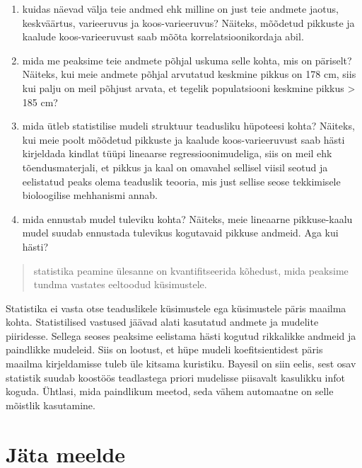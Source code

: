 \documentclass[]{book}
\begin{document}
\begin{enumerate}
\def\labelenumi{\arabic{enumi})}
\item
  kuidas näevad välja teie andmed ehk milline on just teie andmete jaotus, keskväärtus, varieeruvus ja koos-varieeruvus? Näiteks, mõõdetud pikkuste ja kaalude koos-varieeruvust saab mõõta korrelatsioonikordaja abil.
\item
  mida me peaksime teie andmete põhjal uskuma selle kohta, mis on päriselt? Näiteks, kui meie andmete põhjal arvutatud keskmine pikkus on 178 cm, siis kui palju on meil põhjust arvata, et tegelik populatsiooni keskmine pikkus \textgreater{} 185 cm?
\item
  mida ütleb statistilise mudeli struktuur teadusliku hüpoteesi kohta? Näiteks, kui meie poolt mõõdetud pikkuste ja kaalude koos-varieeruvust saab hästi kirjeldada kindlat tüüpi lineaarse regressioonimudeliga, siis on meil ehk tõendusmaterjali, et pikkus ja kaal on omavahel sellisel viisil seotud ja eelistatud peaks olema teaduslik teooria, mis just sellise seose tekkimisele bioloogilise mehhanismi annab.
\item
  mida ennustab mudel tuleviku kohta? Näiteks, meie lineaarne pikkuse-kaalu mudel suudab ennustada tulevikus kogutavaid pikkuse andmeid. Aga kui hästi?
\end{enumerate}

\begin{quote}
statistika peamine ülesanne on kvantifitseerida kõhedust, mida peaksime tundma vastates eeltoodud küsimustele.
\end{quote}

Statistika ei vasta otse teaduslikele küsimustele ega küsimustele päris maailma kohta.
Statistilised vastused jäävad alati kasutatud andmete ja mudelite piiridesse.
Sellega seoses peaksime eelistama hästi kogutud rikkalikke andmeid ja paindlikke mudeleid.
Siis on lootust, et hüpe mudeli koefitsientidest päris maailma kirjeldamisse tuleb üle kitsama kuristiku.
Bayesil on siin eelis, sest osav statistik suudab koostöös teadlastega priori mudelisse piisavalt kasulikku infot koguda.
Ühtlasi, mida paindlikum meetod, seda vähem automaatne on selle mõistlik kasutamine.

\hypertarget{jata-meelde}{%
\section*{Jäta meelde}\label{jata-meelde}}
\end{document}
